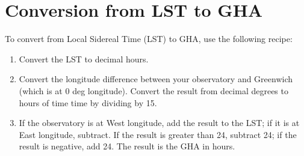 \documentclass[12pt,psfig]{article}
\begin{document}
\section{Conversion from LST to GHA\protect\label{GHA}}

To convert from Local
Sidereal Time (LST) to GHA, use the following recipe:

\begin{enumerate}

\item Convert the LST to decimal hours.

\item Convert the longitude difference between your observatory and
  Greenwich (which is at 0 deg longitude). Convert the result from 
 decimal degrees to hours of time
  time by dividing by 15.

\item If the observatory is at West longitude, add the result to the
  LST; if it is at East
  longitude, subtract. If the result is greater than 24, subtract 24;
  if the result is negative, add 24. The result is the GHA in hours. 

\end{enumerate}
\end{document}
